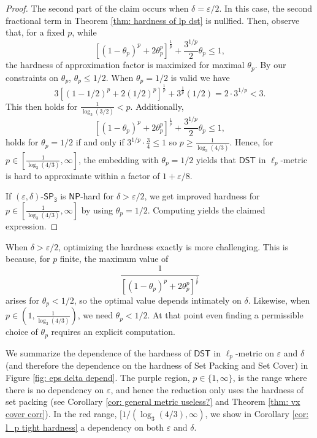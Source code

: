 \documentclass{theoretics}
\newcommand{\1}{\textbf{1}}
\newcommand{\setpT}{$\mathsf{SP_3}$\xspace}
\newcommand{\dst}{$\mathsf{DST}$\xspace}
\newcommand{\np}{$\mathsf{NP}$\xspace}
\newcommand{\pcoord}{\theta_p}
\begin{document}
\begin{proof}
The second part of the claim occurs when $\delta = \varepsilon/2$. In this case, the second fractional term in Theorem \ref{thm: hardness of lp dst} is nullfied. Then, observe that, for a fixed $p$, while 
\[
[(1-\pcoord)^p + 2\pcoord^p]^{\frac{1}{p}} +\frac{3^{1/p}}{2}\pcoord \leq 1,
\]
the hardness of approximation factor is maximized for maximal $\pcoord$. By our constraints on $\pcoord$, $\pcoord \leq 1/2$. When $\pcoord = 1/2$ is valid we have
\[
3[(1-1/2)^p + 2(1/2)^p]^{\frac{1}{p}} + 3^{\frac{1}{p}}(1/2) = 2\cdot3^{1/p} < 3.
\]
This then holds for  $\frac{1}{\log_3(3/2)} < p.$
Additionally, 
\[
[(1-\pcoord)^p + 2\pcoord^p]^{\frac{1}{p}} +\frac{3^{1/p}}{2}\pcoord \leq 1,
\]
holds for $\pcoord = 1/2$ if and only if  $3^{1/p} \cdot \frac{3}{4} \leq 1$ so $p \geq \frac{1}{\log_3(4/3)}.$ Hence, for $p \in [\frac{1}{\log_3(4/3)}, \infty]$, the embedding with $\pcoord = 1/2$ yields that   \dst in $\ell_p$-metric is hard to approximate within a factor of $1 + \varepsilon/8$.



If $(\varepsilon, \delta)$-\setpT is \np-hard for $\delta > \varepsilon/2$, we get improved hardness for $p \in [\frac{1}{\log_3(4/3)}, \infty]$ by using $\theta_p = 1/2$. Computing yields the claimed expression.
\end{proof}




When $\delta > \varepsilon/2$, optimizing the hardness exactly is more challenging. This is because, for $p$ finite, the maximum value of 
\[
\frac{1}{[(1-\pcoord)^p + 2\pcoord^p]^{\frac{1}{p}}}
\]
arises for $\theta_p < 1/2$, so the optimal value depends intimately on $\delta$. Likewise, when $p \in (1, \frac{1}{\log_3(4/3)})$, we need $\pcoord < 1/2$. At that point even finding a permissible choice of $\pcoord$ requires an explicit computation. 

We summarize the dependence of the hardness of  \dst in $\ell_p$-metric  on $\varepsilon$ and $\delta$ (and therefore the dependence on the hardness of Set Packing and Set Cover) in Figure \ref{fig: eps delta depend}. 
The purple region, $p \in \{1, \infty\}$, is the range where there is no dependency on $\varepsilon$, and hence the reduction only uses the hardness of set packing (see Corollary \ref{cor: general metric useless?} and Theorem \ref{thm: vx cover corr}). In the red range, $[1/(\log_3(4/3), \infty)$, we show in Corollary \ref{cor: l_p tight hardness} a dependency on both $\varepsilon$ and $\delta$.
\end{document}
